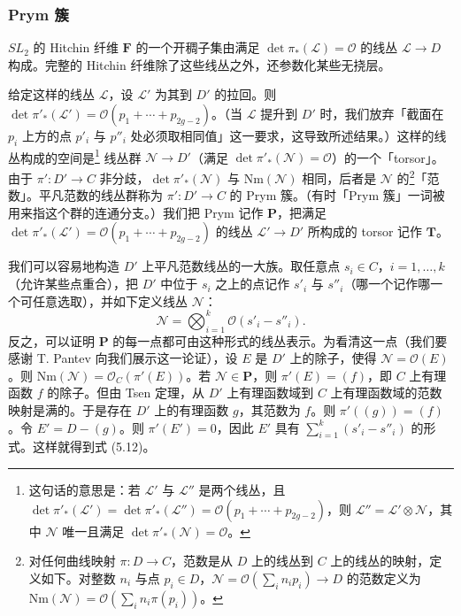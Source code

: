\documentclass[11pt,a4paper]{article}
\begin{document}
\subsubsection{Prym 簇}

$SL_2$ 的 Hitchin 纤维 $\boldsymbol{F}$ 的一个开稠子集由满足 $\det\pi_*(\mathcal{L}) = \mathcal{O}$ 的线丛 $\mathcal{L}\to D$ 构成。完整的 Hitchin 纤维除了这些线丛之外，还参数化某些无挠层。


给定这样的线丛 $\mathcal{L}$，设 $\mathcal{L}'$ 为其到 $D'$ 的拉回。则 $\det\pi'_*(\mathcal{L}') = \mathcal{O}(p_1+\cdots+p_{2g-2})$。（当 $\mathcal{L}$ 提升到 $D'$ 时，我们放弃「截面在 $p_i$ 上方的点 $p'_i$ 与 $p''_i$ 处必须取相同值」这一要求，这导致所述结果。）这样的线丛构成的空间是\footnote{这句话的意思是：若 $\mathcal{L}'$ 与 $\mathcal{L}''$ 是两个线丛，且 $\det\pi'_*(\mathcal{L}') = \det\pi'_*(\mathcal{L}'') = \mathcal{O}(p_1+\cdots+p_{2g-2})$，则 $\mathcal{L}'' = \mathcal{L}'\otimes\mathcal{N}$，其中 $\mathcal{N}$ 唯一且满足 $\det\pi'_*(\mathcal{N}) = \mathcal{O}$。} 线丛群 $\mathcal{N}\to D'$（满足 $\det\pi'_*(\mathcal{N}) = \mathcal{O}$）的一个「torsor」。由于 $\pi': D'\to C$ 非分歧，$\det\pi'_*(\mathcal{N})$ 与 $\mathrm{Nm}(\mathcal{N})$ 相同，后者是 $\mathcal{N}$ 的\footnote{对任何曲线映射 $\pi: D\to C$，范数是从 $D$ 上的线丛到 $C$ 上的线丛的映射，定义如下。对整数 $n_i$ 与点 $p_i\in D$，$\mathcal{N} = \mathcal{O}(\sum_i n_i p_i)\to D$ 的范数定义为 $\mathrm{Nm}(\mathcal{N}) = \mathcal{O}(\sum_i n_i \pi(p_i))$。}「范数」。平凡范数的线丛群称为 $\pi': D'\to C$ 的 Prym 簇。（有时「Prym 簇」一词被用来指这个群的连通分支。）我们把 Prym 记作 $\boldsymbol{P}$，把满足 $\det\pi'_*(\mathcal{L}') = \mathcal{O}(p_1+\cdots+p_{2g-2})$ 的线丛 $\mathcal{L}'\to D'$ 所构成的 torsor 记作 $\boldsymbol{T}$。

我们可以容易地构造 $D'$ 上平凡范数线丛的一大族。取任意点 $s_i\in C$，$i=1,\dots,k$（允许某些点重合），把 $D'$ 中位于 $s_i$ 之上的点记作 $s'_i$ 与 $s''_i$（哪一个记作哪一个可任意选取），并如下定义线丛 $\mathcal{N}$：
\begin{equation}\tag{5.12}
\mathcal{N} = \bigotimes_{i=1}^{k}\mathcal{O}(s'_i - s''_i).
\end{equation}
反之，可以证明 $\boldsymbol{P}$ 的每一点都可由这种形式的线丛表示。为看清这一点（我们要感谢 T. Pantev 向我们展示这一论证），设 $E$ 是 $D'$ 上的除子，使得 $\mathcal{N} = \mathcal{O}(E)$。则 $\mathrm{Nm}(\mathcal{N}) = \mathcal{O}_C(\pi'(E))$。若 $\mathcal{N}\in\boldsymbol{P}$，则 $\pi'(E) = (f)$，即 $C$ 上有理函数 $f$ 的除子。但由 Tsen 定理，从 $D'$ 上有理函数域到 $C$ 上有理函数域的范数映射是满的。于是存在 $D'$ 上的有理函数 $g$，其范数为 $f$。则 $\pi'((g)) = (f)$。令 $E' = D-(g)$。则 $\pi'(E') = 0$，因此 $E'$ 具有 $\sum_{i=1}^{k}(s'_i-s''_i)$ 的形式。这样就得到式 (5.12)。
\end{document}
